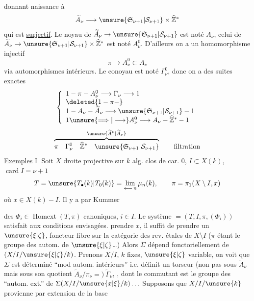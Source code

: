 donnant naissance à
\[\widetilde A_\nu\longrightarrow\unsure{\mathfrak S_{\nu+1}|\mathcal S_{\nu+1}}\times\widehat{\mathbb Z}^*\]
qui est \uline{surjectif}. Le noyau de
$\widetilde A_\nu\to\unsure{\mathfrak S_{\nu+1}|\mathcal S_{\nu+1}}$
est noté $A_\nu$, celui de
$\widetilde A_\nu\to\unsure{\mathfrak S_{\nu+1}|\mathcal S_{\nu+1}}\times\widehat{\mathbb Z}^*$
est noté $A_\nu^0$. D'ailleurs on a
un homomorphisme injectif
\[\pi\longrightarrow A_\nu^0\subset A_\nu\]
via automorphismes intérieurs. Le conoyau
est \deleted{$\unsure{\pi}$} noté $\Gamma_\nu^0$, donc on a des
suites exactes
\[\left\{\begin{array}{l}
1\mathbin{-}\pi\mathbin{-}A_\nu^0\longrightarrow\Gamma_\nu\longrightarrow1\\
\deleted{1\mathbin{-}\pi\mathbin{-}}\\
1\mathbin{-}A_\nu\mathbin{-}\widetilde A_\nu\longrightarrow\unsure{\mathfrak S_{\nu+1}|\mathcal S_{\nu+1}}\mathbin{-}1\\
1\unsure{\Longrightarrow|\longrightarrow}A_\nu^0\longrightarrow A_\nu\mathbin{-}\widehat{\mathbb Z}^*\mathbin{-}1
\end{array}\right.\]
\[\overbrace{\pi\quad\Gamma_\nu^0\quad\widehat{\mathbb Z}^*\quad\unsure{\mathfrak S_{\nu+1}|\mathcal S_{\nu+1}}}^{\unsure{\widetilde A^\nu|\widetilde A_\nu}}\qquad\text{filtration}\]
\uline{Exemples} \textcircled{I} Soit $X$ droite projective sur
$k$ alg. clos de car. $0$, $I\subset X(k)$, $\operatorname{card}I=\nu+1$
\[T=\unsure{T_\bullet(k)|T_0(k)}=\lim_{\longleftarrow\,n}\mu_n(k),\qquad\pi=\pi_1(X\setminus I,x)\]
où $x\in X(k)-I$. Il  y a par Kummer

des $\Phi_i\in\operatorname{Homext}(T,\pi)$ canoniques,
$i\in I$. Le système
$=(T,I,\pi,(\Phi_i))$
satisfait aux conditions envisagées. 
 
 prendre $x$, il suffit
de prendre un $\unsure{\xi|\zeta}$, foncteur fibre sur
la catégorie des rev. étales de $X\setminus I$
($\pi$ étant le groupe des autom. de $\unsure{\xi|\zeta}$\ldots)
Alors $\Sigma$ dépend fonctoriellement de
$(X/I/\unsure{\xi|\zeta}/k)$. Prenons $X/I$, $k$ fixes,
$\unsure{\xi|\zeta}$ variable, on voit que $\Sigma$ est déterminé
``mod autom. intérieurs'' i.e. 
définit un torseur  (non pas
sous $\widetilde A_\nu$ mais sous son quotient
$\widetilde A_\nu/\pi_\nu=)\ \widetilde\Gamma_\nu$,
,
dont le commutant est le groupe
des ``autom. ext.'' de 
$\Sigma(X/I/\unsure{x|\xi}/k)\ldots$
Supposons que $X/I/\unsure{k}$ provienne
par extension de la base

